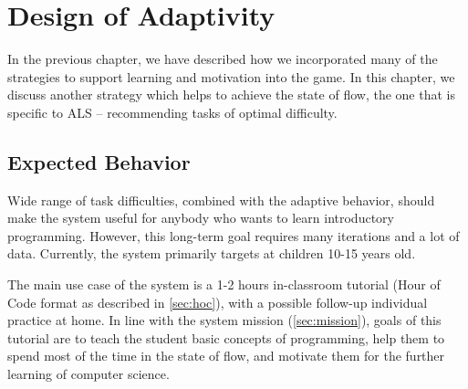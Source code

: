 \chapter{Design of Adaptivity}
\label{chap:design-of-adaptivity}

In the previous chapter, we have described how we incorporated many of the
strategies to support learning and motivation into the game.
In this chapter, we discuss another strategy which helps to achieve the state of
flow, the one that is specific to ALS  %
-- recommending tasks of optimal difficulty.

\section{Expected Behavior}  %
\label{sec:robomission.behavior}



Wide range of task difficulties, combined with the adaptive behavior,
should make the system useful for anybody who wants to learn
introductory programming.
However, this long-term goal requires many iterations and a lot of data.
Currently, the system primarily targets at children 10-15 years old.

The main use case of the system is a 1-2 hours in-classroom tutorial
(Hour of Code format as described in \cref{sec:hoc}),
with a possible follow-up individual practice at home.
In line with the system mission (\cref{sec:mission}), goals of this tutorial
are to teach the student basic concepts of programming,
help them to spend most of the time in the state of flow,
and motivate them for the further learning of computer science.

